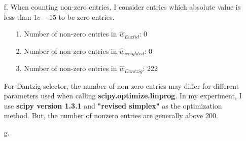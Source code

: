 \documentclass[twoside]{homework}
\begin{document}
\begin{itemize}
\begin{figure}[H]
        \end{figure}
    \newpage
    \item [f.] When counting non-zero entries, I consider entries which absolute value is less than $1e-15$ to be zero entries.
    \begin{itemize}
        \item [1.] Number of non-zero entries in $\hat{w}_{Euclid}$: 0
        \item [2.] Number of non-zero entries in $\hat{w}_{weighted}$: 0
        \item [3.] Number of non-zero entries in $\hat{w}_{Dantzig}$: 222
    \end{itemize}
    For Dantzig selector, the number of non-zero entries may differ for different parameters used when calling \textbf{scipy.optimize.linprog}. In my experiment, I use \textbf{scipy version 1.3.1} and \textbf{"revised simplex"} as the optimization method. But, the number of nonzero entries are generally above 200.
    \item [g.]
\end{itemize}
\newpage
\end{document}
